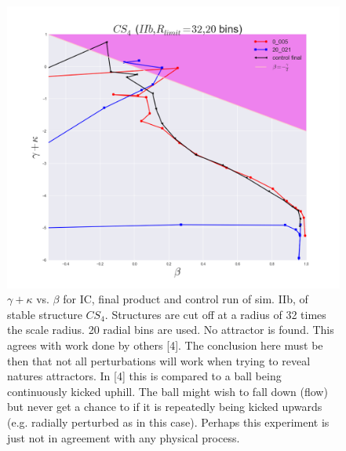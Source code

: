 \begin{figure}[!htbp]
\centering
\includegraphics[width=1.0\linewidth]{img/beta_vs_gamma_plus_kappa_IIb_CS4_Rlimit32.png}
\caption{$\gamma + \kappa$ vs. $\beta$ for IC, final product and control run of sim. IIb, of stable structure $CS_4$.
Structures are cut off at a radius of 32 times the scale radius. 20 radial bins are used.
No attractor is found. This agrees with work done by others [4]. The conclusion here must be then that not all perturbations will work when trying to reveal natures attractors. In [4] this is compared to a ball being continuously kicked uphill. The ball might wish to fall down (flow) but never get a chance to if it is repeatedly being kicked upwards (e.g. radially perturbed as in this case). Perhaps this experiment is just not in agreement with any physical process.}
\label{fig:test}
\end{figure}

